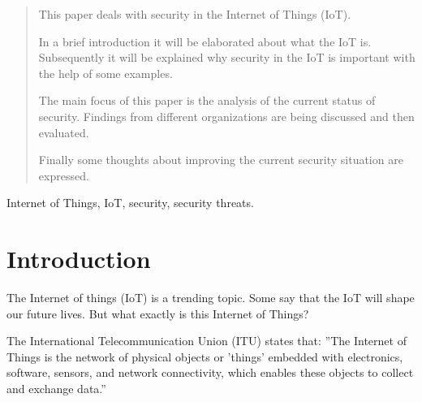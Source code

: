 \documentclass[conference]{IEEEtran}
\begin{document}
\begin{abstract}
This paper deals with security in the Internet of Things (IoT). 

In a brief introduction it will be elaborated about what the IoT is. 
Subsequently it will be explained why security in the IoT is important with the 
help of some examples. 

The main focus of this paper is the analysis of the current status of security. 
Findings from different organizations are being discussed and then evaluated.

Finally some thoughts about improving the current security situation are 
expressed.

\end{abstract}

\begin{IEEEkeywords}
Internet of Things, IoT, security, security threats.
\end{IEEEkeywords}






%
\IEEEpeerreviewmaketitle



\section{Introduction}
The Internet of things (IoT) is a trending topic. Some say that the IoT will 
shape our future lives. But what exactly is this Internet of Things?

The International Telecommunication Union (ITU) states that: ''The Internet of 
Things is the network of physical objects or 'things' embedded with  
electronics, software, sensors, and network connectivity, which 
enables these objects to collect and exchange data.'' \cite{ituPage}
\end{document}
